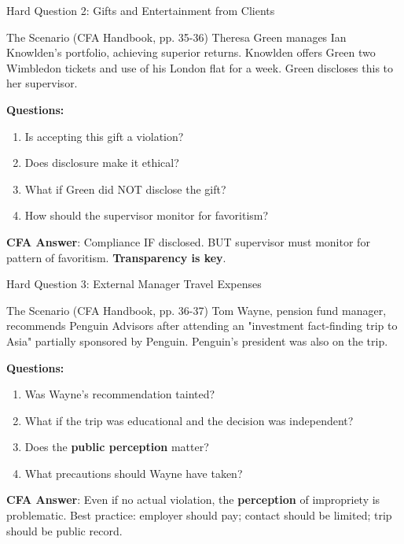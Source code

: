 \documentclass{beamer}
\begin{document}
	\begin{frame}{Hard Question 2: Gifts and Entertainment from Clients}
		\begin{block}{The Scenario (CFA Handbook, pp. 35-36)}
			Theresa Green manages Ian Knowlden's portfolio, achieving superior returns. Knowlden offers Green two Wimbledon tickets and use of his London flat for a week. Green discloses this to her supervisor.
		\end{block}
		
		\vspace{0.2cm}
		\textbf{Questions:}
		\begin{enumerate}
			\item Is accepting this gift a violation?
			\item Does disclosure make it ethical?
			\item What if Green did NOT disclose the gift?
			\item How should the supervisor monitor for favoritism?
		\end{enumerate}
		
		\vspace{0.2cm}
		\textcolor{cfablue}{\textbf{CFA Answer}}: Compliance IF disclosed. BUT supervisor must monitor for pattern of favoritism. \textbf{Transparency is key}.
	\end{frame}
	
	\begin{frame}{Hard Question 3: External Manager Travel Expenses}
		\begin{block}{The Scenario (CFA Handbook, pp. 36-37)}
			Tom Wayne, pension fund manager, recommends Penguin Advisors after attending an "investment fact-finding trip to Asia" partially sponsored by Penguin. Penguin's president was also on the trip.
		\end{block}
		
		\vspace{0.2cm}
		\textbf{Questions:}
		\begin{enumerate}
			\item Was Wayne's recommendation tainted?
			\item What if the trip was educational and the decision was independent?
			\item Does the \textbf{public perception} matter?
			\item What precautions should Wayne have taken?
		\end{enumerate}
		
		\vspace{0.2cm}
		\textcolor{cfablue}{\textbf{CFA Answer}}: Even if no actual violation, the \textbf{perception} of impropriety is problematic. Best practice: employer should pay; contact should be limited; trip should be public record.
	\end{frame}
	
\end{document}
